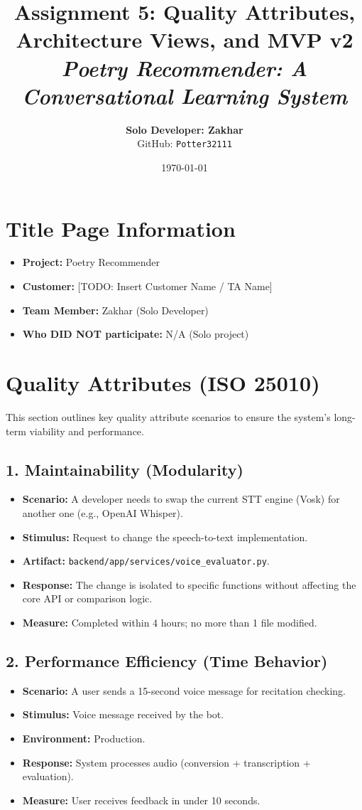 \documentclass[12pt]{article}
\title{
    \huge \textbf{Assignment 5: Quality Attributes, Architecture Views, and MVP v2} \\
    \vspace{0.5cm}
    \large \textit{Poetry Recommender: A Conversational Learning System}
}
\author{
    \textbf{Solo Developer: Zakhar} \\
    GitHub: \texttt{Potter32111}
}
\date{\today}
\begin{document}
\maketitle

\section*{Title Page Information}
\begin{itemize}
    \item \textbf{Project:} Poetry Recommender
    \item \textbf{Customer:} [TODO: Insert Customer Name / TA Name]
    \item \textbf{Team Member:} Zakhar (Solo Developer)
    \item \textbf{Who DID NOT participate:} N/A (Solo project)
\end{itemize}

\newpage

\section{Quality Attributes (ISO 25010)}

This section outlines key quality attribute scenarios to ensure the system's long-term viability and performance.

\subsection{1. Maintainability (Modularity)}
\begin{itemize}
    \item \textbf{Scenario:} A developer needs to swap the current STT engine (Vosk) for another one (e.g., OpenAI Whisper).
    \item \textbf{Stimulus:} Request to change the speech-to-text implementation.
    \item \textbf{Artifact:} \texttt{backend/app/services/voice\_evaluator.py}.
    \item \textbf{Response:} The change is isolated to specific functions without affecting the core API or comparison logic.
    \item \textbf{Measure:} Completed within 4 hours; no more than 1 file modified.
\end{itemize}

\subsection{2. Performance Efficiency (Time Behavior)}
\begin{itemize}
    \item \textbf{Scenario:} A user sends a 15-second voice message for recitation checking.
    \item \textbf{Stimulus:} Voice message received by the bot.
    \item \textbf{Environment:} Production.
    \item \textbf{Response:} System processes audio (conversion + transcription + evaluation).
    \item \textbf{Measure:} User receives feedback in under 10 seconds.
\end{itemize}
\end{document}
